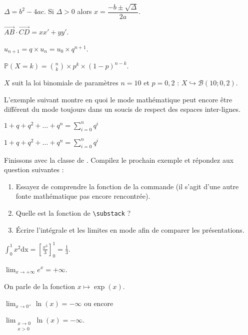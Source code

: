 \documentclass[10pt,french,openright,twoside]{book}
\begin{document}
{\begin{CadreExemple}
$\Delta = b^2 - 4ac$. Si $\Delta > 0$ alors
$x = \dfrac{-b \pm \sqrt \Delta}{2a}$.\medskip

$\overrightarrow{AB} \cdot \overrightarrow{CD} = xx' + yy'$.\medskip

$u_{n + 1} = q\times u_n = u_0 \times q^{n+1}$.\medskip

$\mathds P(X = k) = \binom n k \times p^k \times (1-p)^{n-k}$.\medskip

$X$ suit la loi binomiale de paramètres $n=10$ et $p=0,2$ :
$X \hookrightarrow \mathcal B(10 ; 0,2)$.
\end{CadreExemple}

L'exemple suivant montre en quoi le mode mathématique  peut encore être différent du mode  toujours dans un soucis de respect des espaces inter-lignes.\bigskip

{\NewFont
\begin{SideBySideExample}
    $1 + q + q^2 + \dots + q^n =
    \sum_{i = 0}^n q^i$\medskip

    $1 + q + q^2 + \dots + q^n =
    \displaystyle{\sum_{i = 0}^n q^i}$
\end{SideBySideExample}
}\bigskip

Finissons avec la classe de . Compilez le prochain exemple et répondez aux question suivantes :
\begin{enumerate}
    \item Essayez de comprendre la fonction de la commande  (il s'agit d'une autre fonte mathématique pas encore rencontrée).
    \item Quelle est la fonction de \verb!\substack! ?
    \item \'Ecrire l'intégrale et les limites en mode  afin de comparer les présentations.
\end{enumerate}

{\NewFont
\begin{SideBySideExample}
    $\int_0^1 x^2 \mathrm{dx} =
        \left[\frac{x^3}{3}\right]_0^1 =
        \frac 13$.\medskip

    $\lim_{x \to +\infty} e^x= +\infty$.\par
    On parle de la fonction $x \mapsto \exp(x)$.\medskip

    $\lim_{x \to 0^+}\ln(x) = -\infty$ ou encore\par
    $\lim_{\substack{x \to 0 \\ x > 0}}
            \ln(x) = -\infty$.\medskip


\end{SideBySideExample}}}
\end{document}

